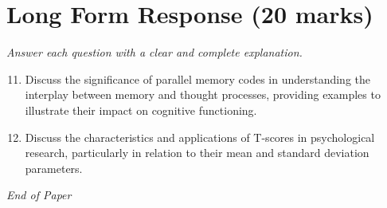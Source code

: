 \documentclass[12pt]{article}
\begin{document}
\section*{Long Form Response (20 marks)}
\textit{Answer each question with a clear and complete explanation.}
\begin{enumerate}[label=\arabic*.]
\setcounter{enumi}{10}
\item Discuss the significance of parallel memory codes in understanding the interplay between memory and thought processes, providing examples to illustrate their impact on cognitive functioning.
\item Discuss the characteristics and applications of T-scores in psychological research, particularly in relation to their mean and standard deviation parameters.
\end{enumerate}

\vfill
\noindent\textit{End of Paper}
\end{document}

